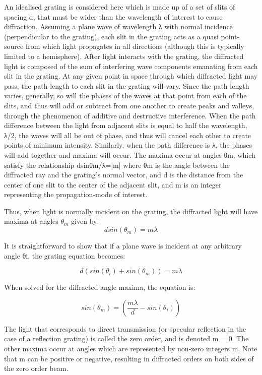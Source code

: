 An idealised grating is considered here which is made up of a set of slits of spacing d, that must be wider than the wavelength of interest to cause diffraction. Assuming a plane wave of wavelength λ with normal incidence (perpendicular to the grating), each slit in the grating acts as a quasi point-source from which light propagates in all directions (although this is typically limited to a hemisphere). After light interacts with the grating, the diffracted light is composed of the sum of interfering wave components emanating from each slit in the grating. At any given point in space through which diffracted light may pass, the path length to each slit in the grating will vary. Since the path length varies, generally, so will the phases of the waves at that point from each of the slits, and thus will add or subtract from one another to create peaks and valleys, through the phenomenon of additive and destructive interference. When the path difference between the light from adjacent slits is equal to half the wavelength, λ/2, the waves will all be out of phase, and thus will cancel each other to create points of minimum intensity. Similarly, when the path difference is λ, the phases will add together and maxima will occur. The maxima occur at angles θm, which satisfy the relationship dsinθm/λ=|m| where θm is the angle between the diffracted ray and the grating's normal vector, and d is the distance from the center of one slit to the center of the adjacent slit, and m is an integer representing the propagation-mode of interest.


Thus, when light is normally incident on the grating, the diffracted light will have maxima at angles $\theta_m$ given by:
\begin{equation*}
d sin(\theta_m) = m\lambda
\end{equation*}

It is straightforward to show that if a plane wave is incident at any arbitrary angle θi, the grating equation becomes:

\begin{equation*}
d(sin(\theta_i) + sin(\theta_m)) = m \lambda
\end{equation*}

When solved for the diffracted angle maxima, the equation is:

\begin{equation*}
sin(\theta_m) = \left(\frac{m\lambda}{d}-sin(\theta_i)\right)
\end{equation*}

The light that corresponds to direct transmission (or specular reflection in the case of a reflection grating) is called the zero order, and is denoted m = 0. The other maxima occur at angles which are represented by non-zero integers m. Note that m can be positive or negative, resulting in diffracted orders on both sides of the zero order beam.

